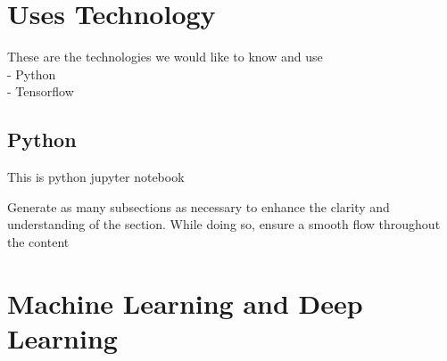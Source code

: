 % 
\section{Uses Technology}
\label{relatedknowledge:Uses Technology}
% 
These are the technologies we would like to know and use \\
- Python \\
- Tensorflow

% 
\subsection{Python}
\label{relatedknowledge:Uses Technology:Python}
% 
This is python jupyter notebook

Generate as many subsections as necessary to enhance the clarity and understanding of the section. While doing so, ensure a smooth flow throughout the content

% 
\section{Machine Learning and Deep Learning}
\label{relatedknowledge:Machine Learning and Deep Learning}
% 
